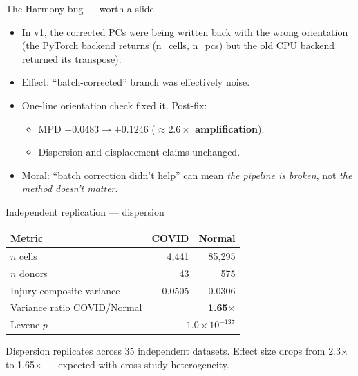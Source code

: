 \documentclass[aspectratio=169]{beamer}
\begin{document}
\begin{frame}{The Harmony bug --- worth a slide}
\begin{itemize}
  \item In v1, the corrected PCs were being written back with the wrong
        orientation (the PyTorch backend returns (n\_cells, n\_pcs) but the
        old CPU backend returned its transpose).
  \item Effect: ``batch-corrected'' branch was effectively noise.
  \item One-line orientation check fixed it. Post-fix:
  \begin{itemize}
    \item MPD $+0.0483 \to +0.1246$ (\textbf{$\approx 2.6\times$ amplification}).
    \item Dispersion and displacement claims unchanged.
  \end{itemize}
  \item Moral: ``batch correction didn't help'' can mean \emph{the pipeline
        is broken}, not \emph{the method doesn't matter}.
\end{itemize}
\end{frame}

\begin{frame}{Independent replication --- dispersion}
\small
\begin{tabular}{lrr}
\toprule
Metric & COVID & Normal \\
\midrule
$n$ cells  & 4{,}441  & 85{,}295 \\
$n$ donors & 43       & 575 \\
Injury composite variance & 0.0505 & 0.0306 \\
Variance ratio COVID/Normal & \multicolumn{2}{r}{\textbf{1.65$\times$}} \\
Levene $p$ & \multicolumn{2}{r}{$1.0\times 10^{-137}$} \\
\bottomrule
\end{tabular}
\vspace{0.5em}
\alert{Dispersion replicates across 35 independent datasets.}
Effect size drops from 2.3$\times$ to 1.65$\times$ --- expected with
cross-study heterogeneity.
\end{frame}
\end{document}
